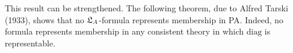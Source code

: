 



This result can be strengthened.
The following theorem,
due to Alfred Tarski (1933),
shows that 
no $\mathfrak{L}_A$-formula represents membership in PA.
Indeed,
no formula represents membership in any consistent theory in which $\mathrm{diag}$ is representable.

